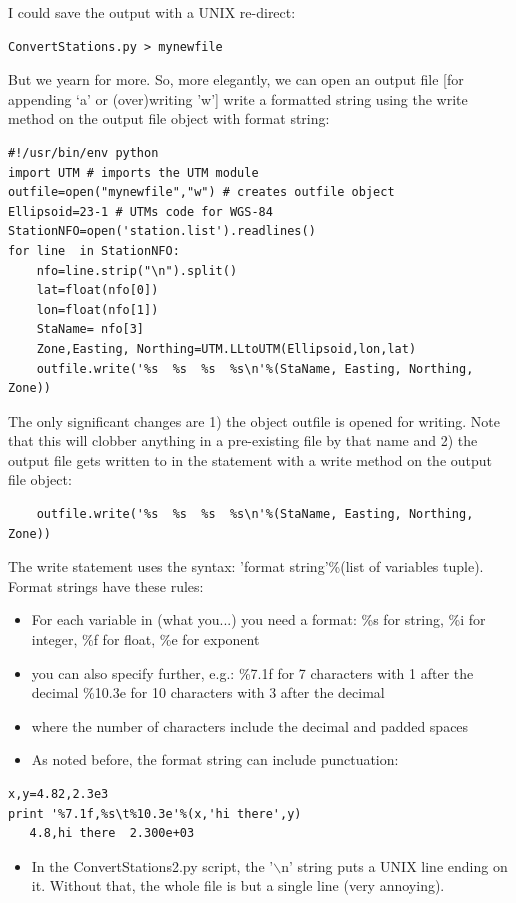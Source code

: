 \documentclass[11pt]{book}
\begin{document}
{{{{\noindent
I could save the output with a UNIX re-direct:
 { \color{blue} \begin{verbatim}
ConvertStations.py > mynewfile
 \end{verbatim}}

But we yearn for more.  So,  more  elegantly, we can open an output file [for appending `a' or (over)writing 'w']  write a formatted string using the write method on  the output file object with format string:

 { \color{blue} \begin{verbatim}
#!/usr/bin/env python
import UTM # imports the UTM module
outfile=open("mynewfile","w") # creates outfile object
Ellipsoid=23-1 # UTMs code for WGS-84
StationNFO=open('station.list').readlines()
for line  in StationNFO:
    nfo=line.strip("\n").split()
    lat=float(nfo[0])
    lon=float(nfo[1])
    StaName= nfo[3]
    Zone,Easting, Northing=UTM.LLtoUTM(Ellipsoid,lon,lat)
    outfile.write('%s  %s  %s  %s\n'%(StaName, Easting, Northing, Zone))
\end{verbatim}}

\noindent
The only significant changes are 1) the object {\color{blue}outfile} is opened for writing. Note that this will clobber anything in a pre-existing file by that name and 2) the output file gets written to in the statement with a write method on the output file object:
{ \color{blue} \begin{verbatim}
    outfile.write('%s  %s  %s  %s\n'%(StaName, Easting, Northing, Zone))
\end{verbatim}}
\noindent
The write statement uses the syntax:  'format string'\%(list of variables tuple).  Format strings have these rules:

\begin{itemize}
\item For each variable in (what you...) you need a format:  \%s for string, \%i for integer, \%f for float, \%e for exponent
\item you can also specify further, e.g.:
\%7.1f  for 7 characters with 1 after the decimal
\%10.3e for 10 characters with 3 after the decimal
\item where the number of characters include the decimal and padded spaces
\item As noted before, the format string can include punctuation:
\end{itemize}
{ \color{blue} \begin{verbatim}
x,y=4.82,2.3e3
print '%7.1f,%s\t%10.3e'%(x,'hi there',y)
   4.8,hi there  2.300e+03
\end{verbatim}}
\begin{itemize}
\item In the {\color{blue}ConvertStations2.py} script, the  '$\backslash$n' string puts a UNIX line ending on it.  Without that, the whole file is but a single line (very annoying).
\end{itemize}




}}}}
\end{document}

